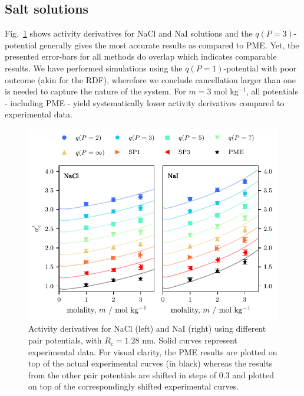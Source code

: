 \documentclass[
journal=jctcce,
manuscript=letter]{achemso}
\begin{document}
\subsection{Salt solutions}

Fig.~\ref{fig:actDers} shows activity derivatives for NaCl and NaI solutions and the $q(P=3)$-potential generally gives the most accurate results as compared to PME. Yet, the presented error-bars for all methods do overlap which indicates comparable results. We have performed simulations using the $q(P=1)$-potential with poor outcome (akin for the RDF), wherefore we conclude cancellation larger than one is needed to capture the nature of the system. For $m = 3$ mol kg$^{-1}$, all potentials - including PME - yield systematically lower activity derivatives compared to experimental data.

\begin{figure}[!ht]
    \centering
    \includegraphics[width=0.9\columnwidth]{actDers.pdf}
    \caption{Activity derivatives for NaCl (left) and NaI (right) using different pair potentials, with $R_c=1.28$ nm. Solid curves represent experimental data.\cite{Robinson1959, Gee2011} For visual clarity, the PME results are plotted on top of the actual experimental curves (in black) whereas the results from the other pair potentials are shifted in steps of $0.3$ and plotted on top of the correspondingly shifted experimental curves.}
    \label{fig:actDers}
\end{figure}
\end{document}
